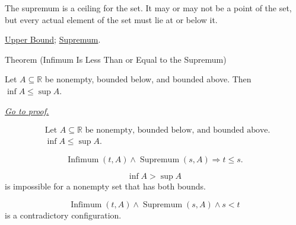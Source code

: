\begin{remark*}[Interpretation]
The supremum is a ceiling for the set. It may or may not be a point of the set, but every actual element of the set must lie at or below it.
\end{remark*}

\begin{dependencies}
\hyperref[def:upper-bound]{Upper Bound};
\hyperref[def:supremum]{Supremum}.
\end{dependencies}


\begin{theorembox}{Theorem (Infimum Is Less Than or Equal to the Supremum)}
\begin{theorem}
\label{thm:infimum-less-than-supremum}
Let $A\subseteq\mathbb{R}$ be nonempty, bounded below, and bounded above. Then $\inf A\le \sup A$.

\smallskip
\noindent
\hyperref[prf:infimum-less-than-supremum]{\textit{Go to proof.}}
\end{theorem}
\end{theorembox}

\begin{remark*}
\[
\begin{aligned}
&\text{Let }A\subseteq\mathbb{R}\text{ be nonempty, bounded below, and bounded above.}\\
&\inf A\le \sup A.
\end{aligned}
\]
\end{remark*}

\begin{remark*}
\[
\operatorname{Infimum}(t,A)\land \operatorname{Supremum}(s,A)
\Longrightarrow
t\le s.
\]
\end{remark*}

\begin{remark*}
\[
\inf A>\sup A
\]
is impossible for a nonempty set that has both bounds.
\end{remark*}

\begin{remark*}
\[
\operatorname{Infimum}(t,A)\land \operatorname{Supremum}(s,A)\land s<t
\]
is a contradictory configuration.
\end{remark*}

